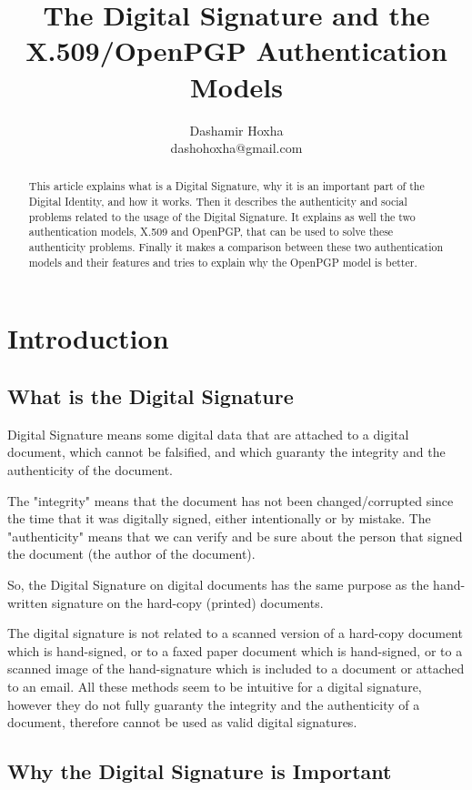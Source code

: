 \documentclass[a4paper]{article}
\title{The Digital Signature and the X.509/OpenPGP Authentication Models}
\author{Dashamir Hoxha \\ dashohoxha@gmail.com}
\begin{document}
\maketitle

\begin{abstract}
This article explains what is a Digital Signature, why it is an
important part of the Digital Identity, and how it works. Then it
describes the authenticity and social problems related to the usage of
the Digital Signature. It explains as well the two authentication
models, X.509 and OpenPGP, that can be used to solve these
authenticity problems. Finally it makes a comparison between these two
authentication models and their features and tries to explain why the
OpenPGP model is better.
\end{abstract}

\section{Introduction}

\subsection{What is the Digital Signature}

Digital Signature means some digital data that are attached to a
digital document, which cannot be falsified, and which guaranty the
integrity and the authenticity of the document.

The "integrity" means that the document has not been changed/corrupted
since the time that it was digitally signed, either intentionally or by
mistake. The "authenticity" means that we can verify and be sure about
the person that signed the document (the author of the document).

So, the Digital Signature on digital documents has the same purpose as
the hand-written signature on the hard-copy (printed) documents.

The digital signature is not related to a scanned version of a
hard-copy document which is hand-signed, or to a faxed paper document
which is hand-signed, or to a scanned image of the hand-signature
which is included to a document or attached to an email. All these
methods seem to be intuitive for a digital signature, however they do
not fully guaranty the integrity and the authenticity of a document,
therefore cannot be used as valid digital signatures.

\subsection{Why the Digital Signature is Important}
\end{document}
